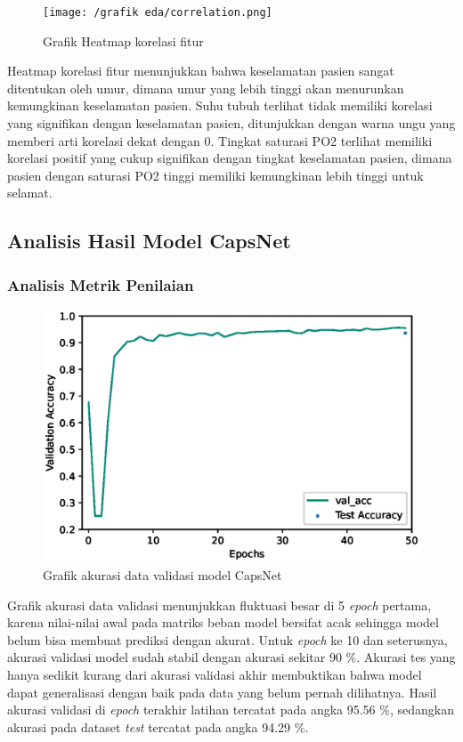 \documentclass{article}
\begin{document}
		
		\begin{figure}[H]
			\centering
			\texttt{[image: /grafik eda/correlation.png]}
			\caption{Grafik Heatmap korelasi fitur}
		\end{figure}
		\par Heatmap korelasi fitur menunjukkan bahwa keselamatan pasien sangat ditentukan oleh umur, dimana umur yang lebih tinggi akan menurunkan kemungkinan keselamatan pasien. Suhu tubuh terlihat tidak memiliki korelasi yang signifikan dengan keselamatan pasien, ditunjukkan dengan warna ungu yang memberi arti korelasi dekat dengan 0. Tingkat saturasi PO2 terlihat memiliki korelasi positif yang cukup signifikan dengan tingkat keselamatan pasien, dimana pasien dengan saturasi PO2 tinggi memiliki kemungkinan lebih tinggi untuk selamat. 
    	
   	\subsection{Analisis Hasil Model CapsNet}
   		\subsubsection{Analisis Metrik Penilaian}   			
   			\begin{figure}[H]
   				\centering
   				\includegraphics[scale=1]{analisis model/final_acc.eps}
   				\caption{Grafik akurasi data validasi model CapsNet}
   			\end{figure}
   			
   			\par Grafik akurasi data validasi menunjukkan fluktuasi besar di 5 \textit{epoch} pertama, karena nilai-nilai awal pada matriks beban model bersifat acak sehingga model belum bisa membuat prediksi dengan akurat. Untuk \textit{epoch} ke 10 dan seterusnya, akurasi validasi model sudah stabil dengan akurasi sekitar 90 \%. Akurasi tes yang hanya sedikit kurang dari akurasi validasi akhir membuktikan bahwa model dapat generalisasi dengan baik pada data yang belum pernah dilihatnya. Hasil akurasi validasi di \textit{epoch} terakhir latihan tercatat pada angka 95.56 \%, sedangkan akurasi pada dataset \textit{test} tercatat pada angka 94.29 \%.
   			
\end{document}
